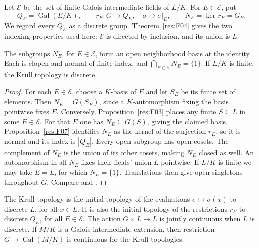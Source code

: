 Let \(\mathcal E\) be the set of finite Galois intermediate fields of
\(L/K\). For \(E\in\mathcal E\), put
\[
 Q_E=\operatorname{Gal}(E/K),\qquad
 r_E\colon G\longrightarrow Q_E,\quad \sigma\longmapsto \sigma|_E,
 \qquad N_E=\ker r_E=G_E.
\]
We regard every \(Q_E\) as a discrete group. Theorem~\ref{res:F04}
gives the two indexing properties used here: \(\mathcal E\) is
directed by inclusion, and its union is \(L\).

\begin{proposition}\label{res:T02}
The subgroups \(N_E\), for \(E\in\mathcal E\), form an open neighborhood
basis at the identity. Each is clopen and normal of finite index, and
\(\bigcap_{E\in\mathcal E}N_E=\{1\}\). If \(L/K\) is finite, the Krull
topology is discrete.
\end{proposition}

\begin{proof}
For each \(E\in\mathcal E\), choose a \(K\)-basis of \(E\) and let \(S_E\)
be its finite set of elements. Then \(N_E=G(S_E)\), since a
\(K\)-automorphism fixing the basis pointwise fixes \(E\). Conversely,
Proposition~\ref{res:F03} places any finite \(S\subseteq L\) in some
\(E\in\mathcal E\). For that \(E\) one has \(N_E\subseteq G(S)\), giving
the claimed basis. Proposition~\ref{res:F07} identifies \(N_E\) as the
kernel of the surjection \(r_E\), so it is normal and its index is
\(|Q_E|\). Every open subgroup has open cosets. The complement of
\(N_E\) is the union of its other cosets, making \(N_E\) closed as well.
An automorphism in all \(N_E\) fixes their fields' union \(L\) pointwise.
If \(L/K\) is finite we may take \(E=L\), for which \(N_E=\{1\}\).
Translations then give open singletons throughout \(G\).
Compare \cite[Propositions 7.6--7.8]{milne} and
\cite[Section 2.11]{rz}.
\end{proof}

\begin{proposition}\label{res:T03}
The Krull topology is the initial topology of the evaluations
\(\sigma\mapsto\sigma(x)\) to discrete \(L\), for all \(x\in L\). It is
also the initial topology of the restrictions \(r_E\) to discrete
\(Q_E\), for all \(E\in\mathcal E\). The action \(G\times L\to L\) is
jointly continuous when \(L\) is discrete. If \(M/K\) is a Galois
intermediate extension, then restriction
\(G\to\operatorname{Gal}(M/K)\) is continuous for the Krull topologies.
\end{proposition}

